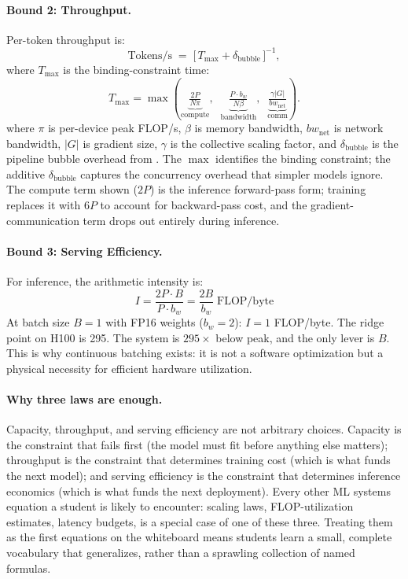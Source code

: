 \documentclass[10pt,twocolumn]{article}
\begin{document}
\paragraph{Bound 2: Throughput.} Per-token throughput is:
\begin{equation}
\label{eq:iron-throughput}
\text{Tokens/s} \;=\; \bigl[\, T_{\max} + \delta_{\text{bubble}} \,\bigr]^{-1},
\end{equation}
where $T_{\max}$ is the binding-constraint time:
\begin{equation}
\label{eq:iron-throughput-tmax}
T_{\max} = \max\!\left(\underbrace{\tfrac{2P}{N \pi}}_{\text{compute}},\;\; \underbrace{\tfrac{P \cdot b_w}{N \beta}}_{\text{bandwidth}},\;\; \underbrace{\tfrac{\gamma |G|}{bw_{\text{net}}}}_{\text{comm}}\right).
\end{equation}
where $\pi$ is per-device peak FLOP/s, $\beta$ is memory bandwidth, $bw_{\text{net}}$ is network bandwidth, $|G|$ is gradient size, $\gamma$ is the collective scaling factor, and $\delta_{\text{bubble}}$ is the pipeline bubble overhead from . The $\max$ identifies the binding constraint; the additive $\delta_{\text{bubble}}$ captures the concurrency overhead that simpler models ignore. The compute term shown ($2P$) is the inference forward-pass form; training replaces it with $6P$ to account for backward-pass cost, and the gradient-communication term drops out entirely during inference.

\paragraph{Bound 3: Serving Efficiency.} For inference, the arithmetic intensity is:
\begin{equation}
\label{eq:iron-serving}
I = \frac{2P \cdot B}{P \cdot b_w} = \frac{2B}{b_w} \;\text{FLOP/byte}
\end{equation}
At batch size $B = 1$ with FP16 weights ($b_w = 2$): $I = 1$ FLOP/byte. The ridge point on H100 is 295. The system is $295\times$ below peak, and the only lever is $B$. This is why continuous batching exists: it is not a software optimization but a physical necessity for efficient hardware utilization.

\paragraph{Why three laws are enough.} Capacity, throughput, and serving efficiency are not arbitrary choices. Capacity is the constraint that fails first (the model must fit before anything else matters); throughput is the constraint that determines training cost (which is what funds the next model); and serving efficiency is the constraint that determines inference economics (which is what funds the next deployment). Every other ML systems equation a student is likely to encounter: scaling laws, FLOP-utilization estimates, latency budgets, is a special case of one of these three. Treating them as the first equations on the whiteboard means students learn a small, complete vocabulary that generalizes, rather than a sprawling collection of named formulas.
\end{document}
